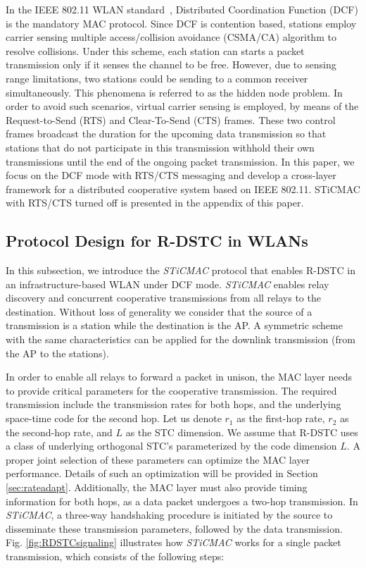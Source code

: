 \documentclass[peerreview,draftcls,onecolumn,12pt,a4paper]{IEEEtran}
\begin{document}
In the IEEE 802.11 WLAN standard~\cite{80211-2007}, Distributed Coordination Function (DCF) is 
the mandatory MAC protocol. Since DCF is contention based, stations employ carrier sensing multiple
access/collision avoidance (CSMA/CA) algorithm to resolve
collisions. Under this scheme, each station can starts a packet
transmission only if it senses the channel to be free. However, due to sensing range limitations, two stations
could be sending to a common receiver simultaneously. This
phenomena is referred to as the hidden node problem. In order to
avoid such scenarios, virtual carrier sensing is employed, by
means of the Request-to-Send (RTS) and Clear-To-Send (CTS) frames.
These two control frames broadcast the duration for the upcoming
data transmission so that stations that do not participate in this
transmission withhold their own transmissions until the end of the
ongoing packet transmission. In this paper, we focus on the DCF
mode with RTS/CTS messaging and develop a cross-layer framework
for a distributed cooperative system based on IEEE 802.11. STiCMAC with RTS/CTS turned off is presented in the appendix of this paper.

\vspace{-0.15in}
\subsection{Protocol Design for R-DSTC in WLANs}
\label{MAC-R-DSTC}
\vspace{-0.05in}

In this subsection, we introduce the
\emph{STiCMAC} protocol that enables R-DSTC in an
infrastructure-based WLAN under DCF mode. \emph{STiCMAC} enables
relay discovery and concurrent cooperative transmissions from all
relays to the destination. Without loss of generality we consider that the source of a transmission is a
station while the destination is the AP. A symmetric scheme with
the same characteristics can be applied for the downlink
transmission (from the AP to the stations). 


In order to enable all relays to forward a packet in unison, the
 MAC layer needs to provide critical parameters for the cooperative
 transmission. The required transmission include the transmission rates for both
 hops, and the underlying space-time code for the second hop. Let us denote $r_1$ as the first-hop rate, $r_2$ as the second-hop rate, and $L$ as the STC dimension.
 We assume that R-DSTC uses a class of underlying orthogonal STC's parameterized by the code dimension $L$. A proper joint selection of these parameters can optimize the MAC layer
 performance. Details of such an optimization will be provided in Section
 \ref{sec:rateadapt}. Additionally, the MAC layer must also provide timing information for both hops, as a data packet undergoes
 a two-hop transmission. In \emph{STiCMAC}, a three-way handshaking procedure is initiated by the source to disseminate these transmission parameters,
  followed by the data transmission. Fig. \ref{fig:RDSTCsignaling} illustrates how \emph{STiCMAC} works for a single packet transmission, which consists of the following steps:
\end{document}
